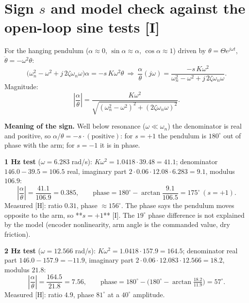 \documentclass[11pt,a4paper]{article}
\begin{document}
\section{Sign $s$ and model check against the open-loop sine tests [I]}

For the hanging pendulum ($\alpha\approx0$, $\sin\alpha\approx\alpha$, $\cos\alpha\approx1$) driven by $\theta=\Theta e^{j\omega t}$, $\ddot\theta=-\omega^2\theta$:
\begin{equation*}
\bigl(\omega_n^2-\omega^2+j\,2\zeta\omega_n\omega\bigr)\alpha=-s\,K\omega^2\theta
\ \Longrightarrow\
\frac{\alpha}{\theta}(j\omega)=\frac{-s\,K\omega^2}{\omega_n^2-\omega^2+j\,2\zeta\omega_n\omega}.
\end{equation*}
Magnitude:
\begin{equation*}
\left|\frac\alpha\theta\right|=\frac{K\omega^2}{\sqrt{(\omega_n^2-\omega^2)^2+(2\zeta\omega_n\omega)^2}} .
\end{equation*}

\textbf{Meaning of the sign.} Well below resonance ($\omega\ll\omega_n$) the denominator is real and positive, so $\alpha/\theta=-s\cdot(\text{positive})$: for $s=+1$ the pendulum is $180^\circ$ out of phase with the arm; for $s=-1$ it is in phase.

\textbf{1 Hz test} ($\omega=6.283$ rad/s): $K\omega^2=1.0418\cdot39.48=41.1$; denominator $146.0-39.5=106.5$ real, imaginary part $2\cdot0.06\cdot12.08\cdot6.283=9.1$, modulus $106.9$:
\begin{equation*}
\left|\frac\alpha\theta\right|=\frac{41.1}{106.9}=0.385,\qquad \text{phase}=180^\circ-\arctan\frac{9.1}{106.5}=175^\circ\ (s=+1).
\end{equation*}
Measured [H]: ratio $0.31$, phase $\approx156^\circ$. The phase says the pendulum moves opposite to the arm, so **$s=+1$** [I]. The $19^\circ$ phase difference is not explained by the model (encoder nonlinearity, arm angle is the commanded value, dry friction).

\textbf{2 Hz test} ($\omega=12.566$ rad/s): $K\omega^2=1.0418\cdot157.9=164.5$; denominator real part $146.0-157.9=-11.9$, imaginary part $2\cdot0.06\cdot12.083\cdot12.566=18.2$, modulus $21.8$:
\begin{equation*}
\left|\frac\alpha\theta\right|=\frac{164.5}{21.8}=7.56,\qquad \text{phase}=180^\circ-\bigl(180^\circ-\arctan\tfrac{18.2}{11.9}\bigr)=57^\circ .
\end{equation*}
Measured [H]: ratio $4.9$, phase $81^\circ$ at a $40^\circ$ amplitude.
\end{document}

